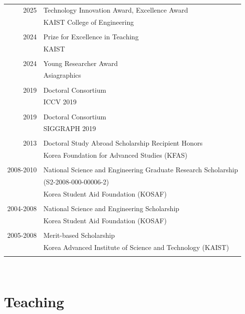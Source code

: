 \documentclass[letterpaper,10pt]{article} %
\newcommand{\blankline}{\quad\pagebreak[2]}
\begin{document}
\begin{tabular}{r|p{11cm}}
2025 & Technology Innovation Award, Excellence Award\\
& KAIST College of Engineering\\
&\\
2024 & Prize for Excellence in Teaching\\
& KAIST\\
&\\
2024 & Young Researcher Award\\
& Asiagraphics\\
&\\
2019 & Doctoral Consortium\\
& ICCV 2019\\
&\\
2019 & Doctoral Consortium\\
& SIGGRAPH 2019\\
&\\
2013 & Doctoral Study Abroad Scholarship Recipient Honors\\
& Korea Foundation for Advanced Studies (KFAS)\\
&\\
2008-2010 & National Science and Engineering Graduate Research Scholarship\\
& (S2-2008-000-00006-2)\\
& Korea Student Aid Foundation (KOSAF)\\
&\\
2004-2008 & National Science and Engineering Scholarship \\
& Korea Student Aid Foundation (KOSAF)\\
&\\
2005-2008 & Merit-based Scholarship\\
& Korea Advanced Institute of Science and Technology (KAIST)\\
&\\
\end{tabular}\\

\blankline



\clearpage
\section{Teaching}
\end{document}

